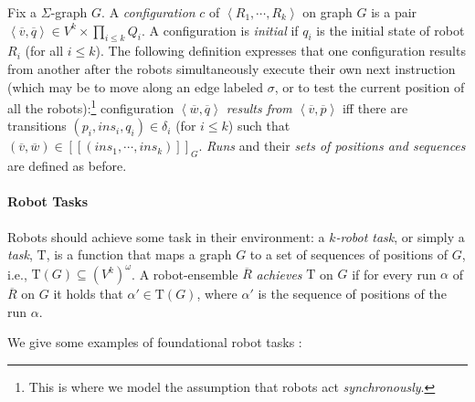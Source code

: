 \documentclass{aamas2015}
\def\T{\mathrm{T}}
\newcommand{\tup}[1]{\overline{#1}}
\newcommand{\tpl}[1]{\left<{#1}\right>}
\newcommand{\sr}[1]{\footnote{{\color{red} Note. #1}}}
\begin{document}
Fix a $\Sigma$-graph $G$. A {\em configuration} $c$ of $\tpl{R_1, \cdots, R_k}$ on graph $G$ is a pair $\tpl{\tup{v},\tup{q}} \in V^k \times \prod_{i \leq k} Q_i$. A configuration is {\em initial} if $q_i$ is the initial state of robot $R_i$ (for all $i \leq k$). The following definition expresses that one configuration results from another after the robots simultaneously execute their own next instruction (which may be to move along an edge labeled $\sigma$, or to test the current position of all the robots):\footnote{This is where we model the assumption that robots act {\em synchronously}.} configuration {\em $\tpl{\tup{w},\tup{q}}$ results from $\tpl{\tup{v},\tup{p}}$} iff there are transitions $(p_i,ins_i,q_i) \in \delta_i$ (for $i \leq k$) such that $(\tup{v},\tup{w}) \in [[(ins_1,\cdots,ins_k)]]_G$. {\em Runs} and their {\em sets of positions and sequences} are defined as before.

\paragraph{Robot Tasks} \label{ex:tasks}

Robots should achieve some task in their environment: a {\em $k$-robot task}, or simply a {\em task}, $\T$, is a function that maps a graph $G$ to a set of sequences of positions of $G$, i.e.,  $\T(G) \subseteq (V^k)^\omega$. A robot-ensemble $\tup{R}$ {\em achieves} $\T$ on $G$ if for every run $\alpha$ of $\tup{R}$ on $G$ it holds that $\alpha' \in \T(G)$, where $\alpha'$ is the sequence of positions of the run $\alpha$.

We give some examples of foundational robot tasks \cite{KKR07handbook}:
\end{document}
